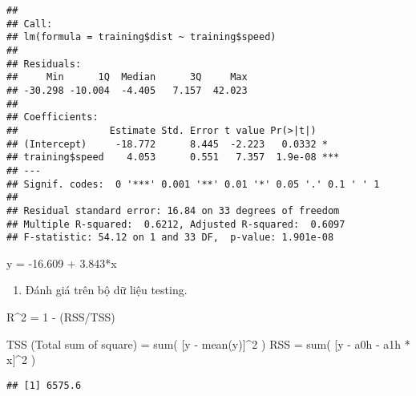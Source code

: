 \documentclass[
]{article}
\newenvironment{Shaded}{\begin{snugshade}}{\end{snugshade}}
\newcommand{\DecValTok}[1]{\textcolor[rgb]{0.00,0.00,0.81}{#1}}
\newcommand{\FunctionTok}[1]{\textcolor[rgb]{0.00,0.00,0.00}{#1}}
\newcommand{\NormalTok}[1]{#1}
\newcommand{\OtherTok}[1]{\textcolor[rgb]{0.56,0.35,0.01}{#1}}
\newcommand{\SpecialCharTok}[1]{\textcolor[rgb]{0.00,0.00,0.00}{#1}}
\providecommand{\tightlist}{%
  \setlength{\itemsep}{0pt}\setlength{\parskip}{0pt}}
\begin{document}
\begin{verbatim}
## 
## Call:
## lm(formula = training$dist ~ training$speed)
## 
## Residuals:
##     Min      1Q  Median      3Q     Max 
## -30.298 -10.004  -4.405   7.157  42.023 
## 
## Coefficients:
##                Estimate Std. Error t value Pr(>|t|)    
## (Intercept)     -18.772      8.445  -2.223   0.0332 *  
## training$speed    4.053      0.551   7.357  1.9e-08 ***
## ---
## Signif. codes:  0 '***' 0.001 '**' 0.01 '*' 0.05 '.' 0.1 ' ' 1
## 
## Residual standard error: 16.84 on 33 degrees of freedom
## Multiple R-squared:  0.6212, Adjusted R-squared:  0.6097 
## F-statistic: 54.12 on 1 and 33 DF,  p-value: 1.901e-08
\end{verbatim}

y = -16.609 + 3.843*x

\begin{enumerate}
\def\labelenumi{\arabic{enumi}.}
\setcounter{enumi}{2}
\tightlist
\item
  Đánh giá trên bộ dữ liệu testing.
\end{enumerate}

R\^{}2 = 1 - (RSS/TSS)

TSS (Total sum of square) = sum( {[}y - mean(y){]}\^{}2 ) RSS = sum(
{[}y - a0h - a1h * x{]}\^{}2 )

\begin{Shaded}
\end{Shaded}

\begin{verbatim}
## [1] 6575.6
\end{verbatim}

\begin{Shaded}
\end{Shaded}
\end{document}
